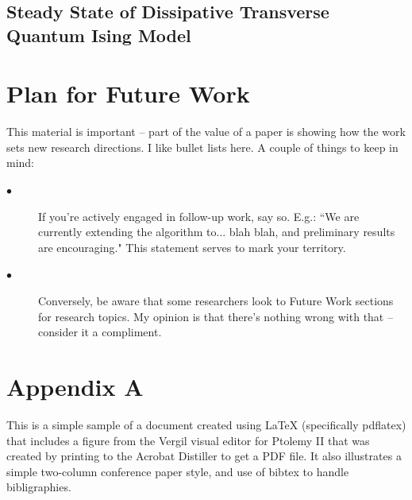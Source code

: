 \documentclass[10pt,twocolumn]{article}
\begin{document}
\subsection{Steady State of Dissipative Transverse Quantum Ising Model}


\section{Plan for Future Work}


This material is important -- part of the value of a paper is showing how the work sets new research directions. I like bullet lists here. A couple of things to keep in mind:
\begin{description}
  \item[$\bullet$]  If you're actively engaged in follow-up work, say so. E.g.: ``We are currently extending the algorithm to... blah blah, and preliminary results are encouraging." This statement serves to mark your territory.
\item[$\bullet$]  Conversely, be aware that some researchers look to Future Work sections for research topics. My opinion is that there's nothing wrong with that -- consider it a compliment.
\end{description}


\section{Appendix A}
This is a simple sample of a document created using \LaTeX
   (specifically pdflatex) that includes a figure from the Vergil visual editor for Ptolemy II
   that was created by printing to the Acrobat Distiller to get a PDF file.
   It also illustrates a simple two-column conference paper style,
   and use of bibtex to handle bibligraphies.
\end{document}

